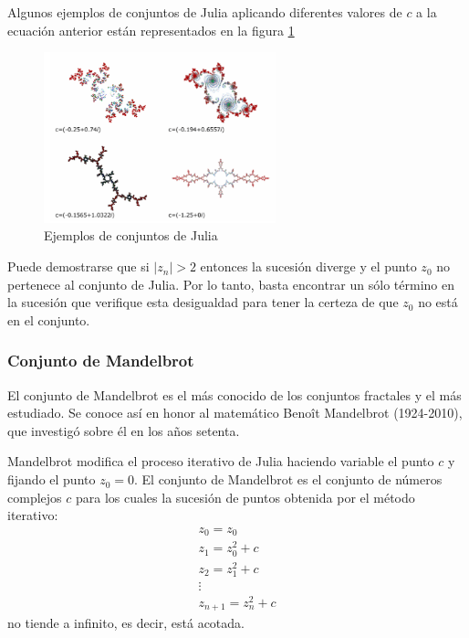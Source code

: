 Algunos ejemplos de conjuntos de Julia aplicando diferentes valores de $c$ a la ecuación anterior están representados en la figura \ref{fig:Julia}

\begin{figure}[hbtp]
\centering
\includegraphics[width = 0.6\textwidth]{img/Julia_sets.png}
\caption{Ejemplos de conjuntos de Julia}
\label{fig:Julia}
\end{figure}

Puede demostrarse que si $|z_n| > 2$ entonces la sucesión diverge y el punto $z_0$ no pertenece al conjunto de Julia. Por lo tanto, basta encontrar un sólo término en la sucesión que verifique esta desigualdad para tener la certeza de que $z_0$ no está en el conjunto.

\subsubsection{Conjunto de Mandelbrot}
\begin{definition}
El conjunto de Mandelbrot es el más conocido de los conjuntos fractales y el más estudiado. Se conoce así en honor al matemático Benoît Mandelbrot (1924-2010), que investigó sobre él en los años setenta.

Mandelbrot modifica el proceso iterativo de Julia haciendo variable el punto $c$ y fijando el punto $z_0=0$. El conjunto de Mandelbrot es el conjunto de números complejos $c$ para los cuales la sucesión de puntos obtenida por el método iterativo:
\[\begin{array}{l}
z_0=z_0\\
z_1=z_0^2+c \\
z_2 = z_1^2 + c \\
\vdots \\
z_{n+1} = z_n^2+c
\end{array}\]
no tiende a infinito, es decir, está acotada.
\end{definition}

